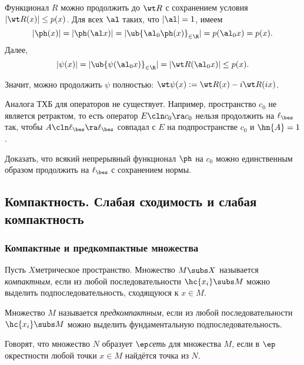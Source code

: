 \documentclass[a4paper]{article}
\begin{document}
Функционал $R$ можно продолжить до $\wt R$ с сохранением условия $|\wt R(x)|\le p(x)$.
Для всех $\al$ таких, что $|\al|=1$, имеем
$$|\ph(x)|=|\ph(\al x)| = |\ub{\al_0\ph(x)}_{\in \R}| = p(\al_0x) = p(x).$$
Далее,
$$|\psi(x)| = |\ub{\psi(\al_0 x)}_{\in \R}| = |\wt R(\al_0 x)| \le p(x).$$

Значит, можно продолжить $\psi$ полностью: $\wt \psi(x) := \wt R(x)-i\wt R(ix)$.

\begin{note}
Аналога ТХБ для операторов не существует. Например, пространство $c_0$ не является ретрактом, то есть
оператор $E\cln c_0\ra c_0$ нельзя продолжить на $\ell_\bes$ так, чтобы $A\cln\ell_\bes\ra \ell_\bes$ совпадал с $E$
на подпространстве $c_0$ и $\hn{A}=1$.
\end{note}

\begin{problem}
Доказать, что всякий непрерывный функционал $\ph$ на $c_0$ можно единственным образом
продолжить на $\ell_\bes$ с сохранением нормы.
\end{problem}

\subsection{Компактность. Слабая сходимость и слабая компактность}

\subsubsection{Компактные и предкомпактные множества}

\begin{df}
Пусть $X$\т метрическое пространство. Множество $M \subs X$ называется \emph{компактным},
если из любой последовательности $\hc{x_i} \subs M$ можно выделить подпоследовательность,
сходящуюся к $x \in M$.
\end{df}

\begin{df}
Множество $M$ называется \emph{предкомпактным}, если
из любой последовательности $\hc{x_i} \subs M$ можно выделить фундаментальную
подпоследовательность.
\end{df}

\begin{df}
Говорят, что множество $N$ образует $\ep$\д \emph{сеть} для множества $M$,
если в $\ep$\д окрестности любой точки $x \in M$ найдётся точка из $N$.
\end{df}
\end{document}
